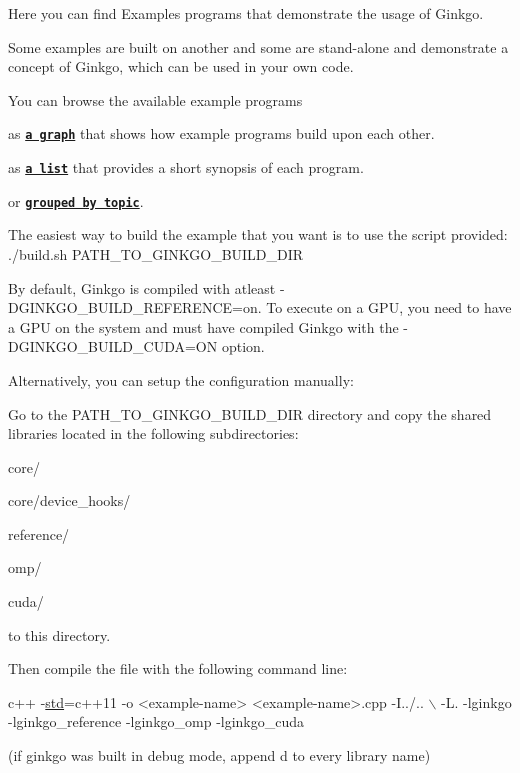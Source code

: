 Here you can find Examples programs that demonstrate the usage of Ginkgo.

Some examples are built on another and some are stand-\/alone and demonstrate a concept of Ginkgo, which can be used in your own code.

You can browse the available example programs 
\begin{DoxyEnumerate}
\item as {\bfseries \href{#graph}{\tt a graph}} that shows how example programs build upon each other. 
\item as {\bfseries \href{#list}{\tt a list}} that provides a short synopsis of each program. 
\item or {\bfseries \href{#topic}{\tt grouped by topic}}. 
\end{DoxyEnumerate}

The easiest way to build the example that you want is to use the script provided\+: {\ttfamily ./build.sh P\+A\+T\+H\+\_\+\+T\+O\+\_\+\+G\+I\+N\+K\+G\+O\+\_\+\+B\+U\+I\+L\+D\+\_\+\+D\+IR }

By default, Ginkgo is compiled with atleast {\ttfamily -\/\+D\+G\+I\+N\+K\+G\+O\+\_\+\+B\+U\+I\+L\+D\+\_\+\+R\+E\+F\+E\+R\+E\+N\+CE=on}. To execute on a G\+PU, you need to have a G\+PU on the system and must have compiled Ginkgo with the {\ttfamily -\/\+D\+G\+I\+N\+K\+G\+O\+\_\+\+B\+U\+I\+L\+D\+\_\+\+C\+U\+DA=ON} option.

Alternatively, you can setup the configuration manually\+:

Go to the {\ttfamily  P\+A\+T\+H\+\_\+\+T\+O\+\_\+\+G\+I\+N\+K\+G\+O\+\_\+\+B\+U\+I\+L\+D\+\_\+\+D\+IR } directory and copy the shared libraries located in the following subdirectories\+: 
\begin{DoxyEnumerate}
\item {\ttfamily core/} 
\item {\ttfamily core/device\+\_\+hooks/} 
\item {\ttfamily reference/} 
\item {\ttfamily omp/} 
\item {\ttfamily cuda/} 
\end{DoxyEnumerate}to this directory.

Then compile the file with the following command line\+: 
\begin{DoxyCode}
c++ -\hyperlink{namespacestd}{std}=c++11 -o <example-name> <example-name>.cpp -I../.. \(\backslash\)
-L. -lginkgo -lginkgo\_reference -lginkgo\_omp -lginkgo\_cuda
\end{DoxyCode}
 (if ginkgo was built in debug mode, append \textquotesingle{}d\textquotesingle{} to every library name)

